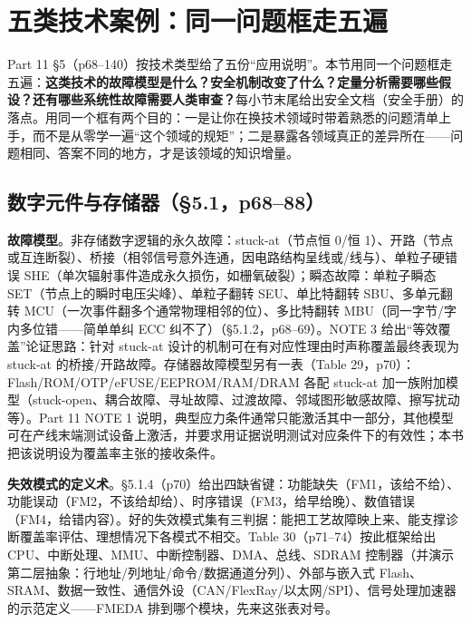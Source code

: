 \section{五类技术案例：同一问题框走五遍}

Part 11 §5（p68–140）按技术类型给了五份“应用说明”。本节用同一个问题框走五遍：\textbf{这类技术的故障模型是什么？安全机制改变了什么？定量分析需要哪些假设？还有哪些系统性故障需要人类审查？}每小节末尾给出安全文档（安全手册）的落点。用同一个框有两个目的：一是让你在换技术领域时带着熟悉的问题清单上手，而不是从零学一遍“这个领域的规矩”；二是暴露各领域真正的差异所在——问题相同、答案不同的地方，才是该领域的知识增量。

\subsection{数字元件与存储器（§5.1，p68–88）}

\textbf{故障模型}。非存储数字逻辑的永久故障：stuck-at（节点恒 0/恒 1）、开路（节点或互连断裂）、桥接（相邻信号意外连通，因电路结构呈线或/线与）、单粒子硬错误 SHE（单次辐射事件造成永久损伤，如栅氧破裂）；瞬态故障：单粒子瞬态 SET（节点上的瞬时电压尖峰）、单粒子翻转 SEU、单比特翻转 SBU、多单元翻转 MCU（一次事件翻多个通常物理相邻的位）、多比特翻转 MBU（同一字节/字内多位错——简单单纠 ECC 纠不了）（§5.1.2，p68–69）。NOTE 3 给出“等效覆盖”论证思路：针对 stuck-at 设计的机制可在有对应性理由时声称覆盖最终表现为 stuck-at 的桥接/开路故障。存储器故障模型另有一表（Table 29，p70）：Flash/ROM/OTP/eFUSE/EEPROM/RAM/DRAM 各配 stuck-at 加一族附加模型（stuck-open、耦合故障、寻址故障、过渡故障、邻域图形敏感故障、擦写扰动等）。Part 11 NOTE 1 说明，典型应力条件通常只能激活其中一部分，其他模型可在产线末端测试设备上激活，并要求用证据说明测试对应条件下的有效性；本书把该说明设为覆盖率主张的接收条件。

\textbf{失效模式的定义术}。§5.1.4（p70）给出四缺省键：功能缺失（FM1，该给不给）、功能误动（FM2，不该给却给）、时序错误（FM3，给早给晚）、数值错误（FM4，给错内容）。好的失效模式集有三判据：能把工艺故障映上来、能支撑诊断覆盖率评估、理想情况下各模式不相交。Table 30（p71–74）按此框架给出 CPU、中断处理、MMU、中断控制器、DMA、总线、SDRAM 控制器（并演示第二层抽象：行地址/列地址/命令/数据通道分列）、外部与嵌入式 Flash、SRAM、数据一致性、通信外设（CAN/FlexRay/以太网/SPI）、信号处理加速器的示范定义——FMEDA 排到哪个模块，先来这张表对号。

